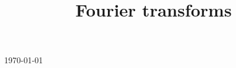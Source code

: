 

\title{Fourier transforms}

\usepackage[sort=standard]{glossaries} 
\makeglossaries



\maketitle
\centerline{\today}
\tableofcontents







